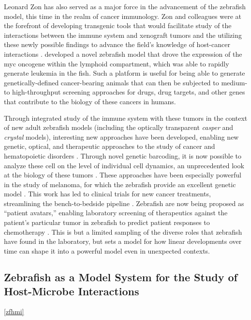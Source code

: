 Leonard Zon has also served as a major force in the advancement of the zebrafish model, this time in the realm of cancer immunology. Zon and colleagues were at the forefront of developing transgenic tools that would facilitate study of the interactions between the immune system and xenograft tumors and the utilizing these newly possible findings to advance the field's knowledge of host-cancer interactions \citet{Cagan2019, Amatruda2002, Trede2004, McConnell2021}. \citet{Langenau2003} developed a novel zebrafish model that drove the expression of the myc oncogene within the lymphoid compartment, which was able to rapidly generate leukemia in the fish. Such a platform is useful for being able to generate genetically-defined cancer-bearing animals that can then be subjected to medium- to high-throughput screening approaches for drugs, drug targets, and other genes that contribute to the biology of these cancers in humans. 

Through integrated study of the immune system with these tumors in the context of new adult zebrafish models (including the optically transparent \textit{casper} and \textit{crystal} models), interesting new approaches have been developed, enabling new genetic, optical, and therapeutic approaches to the study of cancer \citep{Yan2021, Yan2019, Stern2003, GomezAbenza2019, Hason2019, White2013} and hematopoietic disorders \citep{deJong2011, Tang2014}. Through novel genetic barcoding, it is now possible to analyze these cell on the level of individual cell dynamics, an unprecedented look at the biology of these tumors \citep{Sankaran2022}. These approaches have been especially powerful in the study of melanoma, for which the zebrafish provide an excellent genetic model \citep{Kaufman2016}. This work has led to clinical trials for new cancer treatments, streamlining the bench-to-bedside pipeline \citep{Hanna2021}. Zebrafish are now being proposed as ``patient avatars,'' enabling laboratory screening of therapeutics against the patient's particular tumor in zebrafish to predict patient responses to chemotherapy \citep{Li2012, Yan2019, Fazio2020}. This is but a limited sampling of the diverse roles that zebrafish have found in the laboratory, but sets a model for how linear developments over time can shape it into a powerful model even in unexpected contexts.

\subsection{Zebrafish as a Model System for the Study of Host-Microbe Interactions}\autoref{zfhmi}

